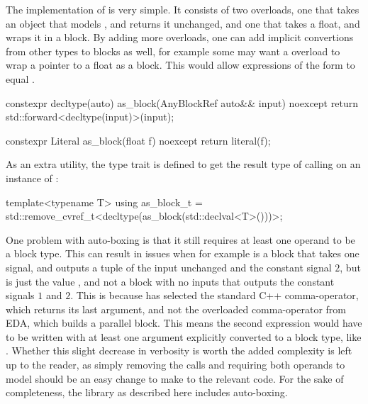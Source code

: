The implementation of  is very simple. It consists of two overloads, one that takes an
object that models , and returns it unchanged, and one that takes a float, and wraps
it in a  block. By adding more  overloads, one can add implicit convertions from other types to
blocks as well, for example some may want a  overload to wrap a pointer to a float as a  block. This would allow expressions
of the form  to equal .

\begin{cppcodenl}
  constexpr decltype(auto) as_block(AnyBlockRef auto&& input) noexcept
  {
    return std::forward<decltype(input)>(input);
  }

  constexpr Literal as_block(float f) noexcept
  {
    return literal(f);
  }
\end{cppcodenl}

As an extra utility, the  type trait is defined to get the result type of calling  on an instance of :

\begin{cppcodenl}
  template<typename T>
  using as_block_t = std::remove_cvref_t<decltype(as_block(std::declval<T>()))>;
\end{cppcodenl}

One problem with auto-boxing is that it still requires at least one operand to be a block type. This can
result in issues when for example  is a block that takes one signal, and outputs a
tuple of the input unchanged and the constant signal $2$, but
 is just the value , and not a block with no inputs that outputs the constant signals
$1$ and $2$. This is because  has selected the
standard C++ comma-operator, which returns its last argument, and not the overloaded comma-operator from EDA,
which builds a parallel block. This means the second expression would have to be written with at least one
argument explicitly converted to a block type, like .  Whether this slight decrease in
verbosity is worth the added complexity is left up to the reader, as simply removing the
 calls and requiring both operands to model  should be an easy
change to make to the relevant code. For the sake of completeness, the library as described here includes
auto-boxing.


